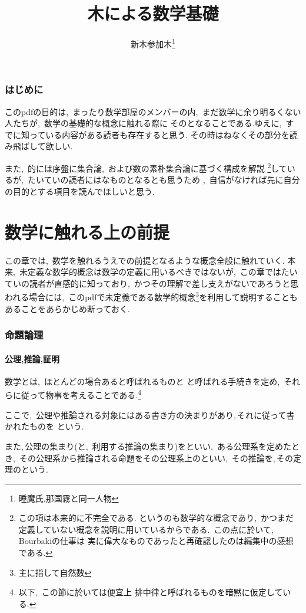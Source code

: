 \documentclass[hyperref,a4paper,12pt]{kininaruki}
\title{木による数学基礎}
\author{新木参加木\thanks{睡魔氏,那国霧と同一人物}}
\date{}
\begin{document}
\maketitle
\section*{はじめに}
このpdfの目的は,\, まったり数学部屋のメンバーの内,\, まだ数学に余り明るくない人たちが,\, 数学の基礎的な概念に触れる際に
そのとなることである.ゆえに,\, すでに知っている内容がある読者も存在すると思う.
その時はねなくその部分を読み飛ばして欲しい.

また,\, 的には序盤に集合論,\, および数の素朴集合論に基づく構成を解説
\footnote{この項は本来的に不完全である.%
というのも数学的な概念であり,\, かつまだ定義していない概念を説明に用いているからである.%
\,この点に於いて,\, Bourbakiの仕事は%
実に偉大なものであったと再確認したのは編集中の感想である.}しているが,\, 
たいていの読者にはなものとなるとも思うため%
,\, 自信がなければ先に自分の目的とする項目を読んでほしいと思う.
\newpage
\tableofcontents
\newpage
\part{数学に触れる上の前提}
この章では,\, 数学を触れるうえでの前提となるような概念全般に触れていく.
本来,\, 未定義な数学的概念は数学の定義に用いるべきではないが,\, この章ではたいていの読者が直感的に知っており,\, %
かつその理解で差し支えがないであろうと思われる場合には,\, このpdfで未定義である数学的概念\footnote{%
主に指して自然数}を利用して説明することもあることをあらかじめ断っておく.
\section{命題論理}
\subsection{公理,推論,証明}
数学とは,\, ほとんどの場合あると呼ばれるものと%
と呼ばれる手続きを定め,\, それらに従って物事を考えることである.\footnote{以下,\, この節に於いては便宜上%
排中律と呼ばれるものを暗黙に仮定している.}

ここで,\, 公理や推論される対象にはある書き方の決まりがあり,\,それに従って書かれたものを%
という.

また,\,公理の集まり(と,\, 利用する推論の集まり)をといい,\, %
ある公理系を定めたとき,\, その公理系から推論される命題をその公理系上のといい,\, %
その推論を,\,その定理のという.
\end{document}
